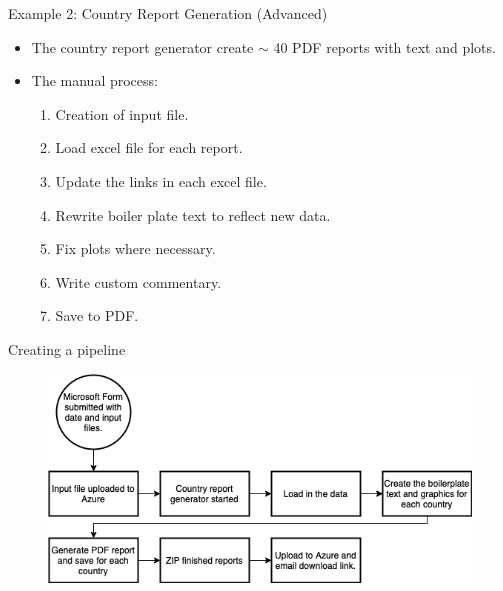 \documentclass[aspectratio=169]{beamer}
\begin{document}
\begin{frame}{Example 2: Country Report Generation (Advanced)}

\begin{itemize}
	\item The country report generator create $\sim$ 40 PDF reports with text and plots. 
	\item The manual process:
	\begin{enumerate}
		\item Creation of input file.
		\item Load excel file for each report.
		\item Update the links in each excel file.
		\item Rewrite boiler plate text to reflect new data.
		\item Fix plots where necessary.
		\item Write custom commentary.
		\item Save to PDF.
	\end{enumerate}
\end{itemize}

\end{frame}

\begin{frame}{Creating a pipeline}
\begin{figure}
\centering
\includegraphics[width=0.7\linewidth]{graphics/CountryReportGenerator.drawio.png}	
\end{figure}

\end{frame}
\end{document}
